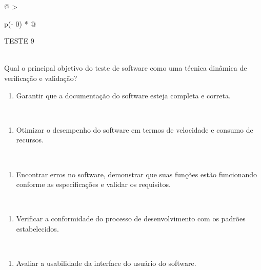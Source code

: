 \documentclass[
]{book}
\providecommand{\tightlist}{%
  \setlength{\itemsep}{0pt}\setlength{\parskip}{0pt}}
\begin{document}
\begin{longtable}[]{@{}
  >{\raggedright\arraybackslash}p{(\columnwidth - 0\tabcolsep) * }@{}}
\toprule\noalign{}
\begin{minipage}[b]{\linewidth}\raggedright
TESTE 9
\end{minipage} \\
\midrule\noalign{}
\endhead
\bottomrule\noalign{}
\endlastfoot
Qual o principal objetivo do teste de software como uma técnica dinâmica de verificação e validação? \\
\begin{minipage}[t]{\linewidth}\raggedright
\begin{enumerate}
\def\labelenumi{\Alph{enumi})}
\tightlist
\item
  Garantir que a documentação do software esteja completa e correta.
\end{enumerate}
\end{minipage} \\
\begin{minipage}[t]{\linewidth}\raggedright
\begin{enumerate}
\def\labelenumi{\Alph{enumi})}
\setcounter{enumi}{1}
\tightlist
\item
  Otimizar o desempenho do software em termos de velocidade e consumo de recursos.
\end{enumerate}
\end{minipage} \\
\begin{minipage}[t]{\linewidth}\raggedright
\begin{enumerate}
\def\labelenumi{\Alph{enumi})}
\setcounter{enumi}{2}
\tightlist
\item
  Encontrar erros no software, demonstrar que suas funções estão funcionando conforme as especificações e validar os requisitos.
\end{enumerate}
\end{minipage} \\
\begin{minipage}[t]{\linewidth}\raggedright
\begin{enumerate}
\def\labelenumi{\Alph{enumi})}
\setcounter{enumi}{3}
\tightlist
\item
  Verificar a conformidade do processo de desenvolvimento com os padrões estabelecidos.
\end{enumerate}
\end{minipage} \\
\begin{minipage}[t]{\linewidth}\raggedright
\begin{enumerate}
\def\labelenumi{\Alph{enumi})}
\setcounter{enumi}{4}
\tightlist
\item
  Avaliar a usabilidade da interface do usuário do software.
\end{enumerate}
\end{minipage} \\
\end{longtable}
\end{document}
